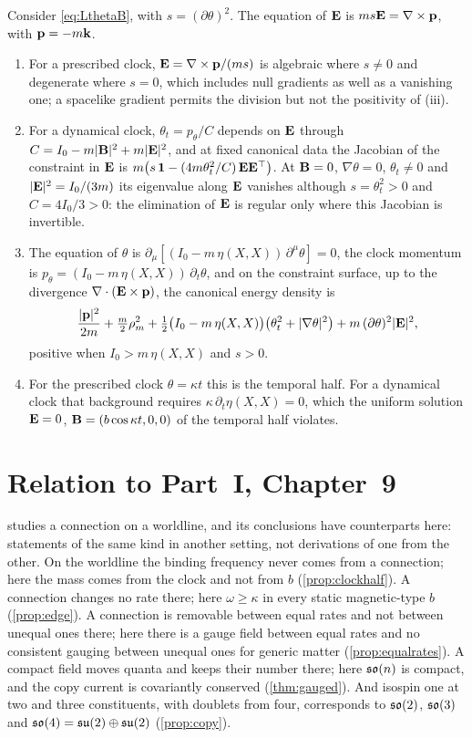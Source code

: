 \begin{proposition}
\label{prop:clockhalf}
Consider \cref{eq:LthetaB}, with $s=(\partial\theta)^2$. The equation of $\mathbf E$ is $ms\mathbf E=\nabla\times\mathbf p$, with $\mathbf p=-m\mathbf k$.
\begin{enumerate}[label=(\roman*),leftmargin=2.2em,itemsep=1pt]
\item For a prescribed clock, $\mathbf E=\nabla\times\mathbf p/(ms)$ is algebraic where $s\ne0$ and degenerate where $s=0$, which includes null gradients as
well as a vanishing one; a spacelike gradient permits the division but not the positivity of (iii).
\item For a dynamical clock, $\theta_t=p_\theta/C$ depends on $\mathbf E$ through $C=I_0-m|\mathbf B|^2+m|\mathbf E|^2$, and at fixed canonical data the
Jacobian of the constraint in $\mathbf E$ is $m\bigl(s\,\mathbf 1-(4m\theta_t^2/C)\,\mathbf E\mathbf E^\top\bigr)$. At $\mathbf B=0$, $\nabla\theta=0$, $\theta_t\ne0$
and $|\mathbf E|^2=I_0/(3m)$ its eigenvalue along $\mathbf E$ vanishes although $s=\theta_t^2>0$ and $C=4I_0/3>0$: the elimination of $\mathbf E$ is regular
only where this Jacobian is invertible.
\item The equation of $\theta$ is $\partial_\mu[(I_0-m\,\eta(X,X))\,\partial^\mu\theta]=0$, the clock momentum is
$p_\theta=(I_0-m\,\eta(X,X))\,\partial_t\theta$, and on the constraint surface, up to the divergence $\nabla\cdot(\mathbf E\times\mathbf p)$, the canonical
energy density is
\[
\frac{|\mathbf p|^2}{2m}+\tfrac m2\rho_m^2+\tfrac12\bigl(I_0-m\,\eta(X,X)\bigr)\bigl(\theta_t^2+|\nabla\theta|^2\bigr)+m\,(\partial\theta)^2|\mathbf E|^2 ,
\]
positive when $I_0>m\,\eta(X,X)$ and $s>0$.
\item For the prescribed clock $\theta=\kappa t$ this is the temporal half. For a dynamical clock that background requires
$\kappa\,\partial_t\eta(X,X)=0$, which the uniform solution $\mathbf E=0$, $\mathbf B=(b\cos\kappa t,0,0)$ of the temporal half violates.
\end{enumerate}
\end{proposition}

\section{Relation to Part~I, Chapter~9}

 studies a connection on a worldline, and its conclusions have counterparts here: statements of the same kind in another
setting, not derivations of one from the other. On the worldline the binding frequency never comes from a connection; here the mass comes
from the clock and not from $b$ (\cref{prop:clockhalf}). A connection changes no rate there; here $\omega\ge\kappa$ in every static
magnetic-type $b$ (\cref{prop:edge}). A connection is removable between equal rates and not between unequal ones there; here there is a
gauge field between equal rates and no consistent gauging between unequal ones for generic matter (\cref{prop:equalrates}). A compact field
moves quanta and keeps their number there; here $\mathfrak{so}(n)$ is compact, and the copy current is covariantly conserved (\cref{thm:gauged}). And
isospin one at two and three constituents, with doublets from four, corresponds to $\mathfrak{so}(2)$, $\mathfrak{so}(3)$ and $\mathfrak{so}(4)=\mathfrak{su}(2)\oplus\mathfrak{su}(2)$
(\cref{prop:copy}).


